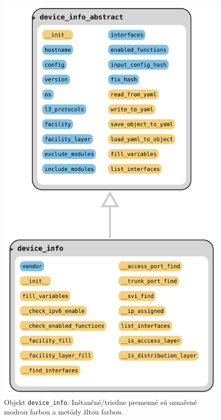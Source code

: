 \begin{figure}[H]
	\begin{center}
		\includegraphics[scale=0.45]{obrazky/device_info_class.pdf}
	\end{center}
	\caption[Objekt \texttt{device\_info}. Inštančné/triedne premenné sú označené modrou farbou a metódy žltou farbou.]{Objekt \texttt{device\_info}. Inštančné/triedne premenné sú označené modrou farbou a metódy žltou farbou.}
	\label{device_class}
\end{figure}

